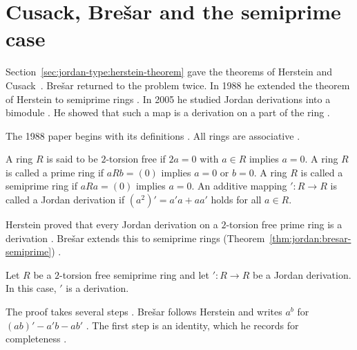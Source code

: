 \section{Cusack, Brešar and the semiprime case}\label{sec:jordan-type:semiprime}

Section~\ref{sec:jordan-type:herstein-theorem} gave the theorems of Herstein
and Cusack~\cite[p.~411]{Bresar2005}. Brešar returned to the problem twice. In 1988 he extended the
theorem of Herstein to semiprime rings \cite[p.~1003]{Bresar1988}. In 2005 he
studied Jordan derivations into a bimodule \cite[p.~411]{Bresar2005}. He
showed that such a map is a derivation on a part of the ring
\cite[p.~411]{Bresar2005}.


The 1988 paper begins with its definitions \cite[p.~1003]{Bresar1988}. All
rings are associative \cite[p.~1003]{Bresar1988}.

\begin{definition}\label{def:jordan:bresar-1988}
A ring $R$ is said to be $2$-torsion free if $2a=0$ with $a\in R$ implies $a=0$. A ring $R$
is called a prime ring if $aRb=(0)$ implies $a=0$ or $b=0$. A ring $R$ is called a semiprime
ring if $aRa=(0)$ implies $a=0$. An additive mapping $'\colon R\to R$ is called a Jordan
derivation if $(a^{2})'=a'a+aa'$ holds for all $a\in R$.
\end{definition}

Herstein proved that every Jordan derivation on a $2$-torsion free prime ring
is a derivation \cite[p.~1003]{Bresar1988}. Brešar extends this to semiprime
rings (Theorem~\ref{thm:jordan:bresar-semiprime}) \cite[p.~1003]{Bresar1988}.

\begin{theorem}\label{thm:jordan:bresar-semiprime}
Let $R$ be a $2$-torsion free semiprime ring and let $'\colon R\to R$ be a Jordan
derivation. In this case, $'$ is a derivation.
\end{theorem}

The proof takes several steps \cite[p.~1004]{Bresar1988}. Brešar follows
Herstein and writes $a^{b}$ for $(ab)'-a'b-ab'$ \cite[p.~1004]{Bresar1988}.
The first step is an identity, which he records for completeness
\cite[p.~1004]{Bresar1988}. %

